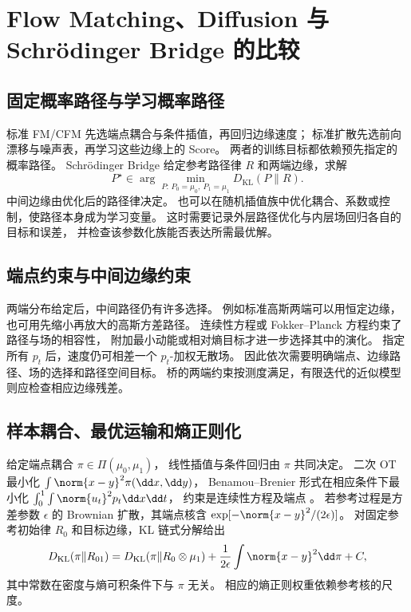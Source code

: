 \section{Flow Matching、Diffusion 与 Schrödinger Bridge 的比较}
\label{sec:unified-comparison}

\subsection{固定概率路径与学习概率路径}

标准 FM/CFM 先选端点耦合与条件插值，再回归边缘速度；
标准扩散先选前向漂移与噪声表，再学习这些边缘上的 Score。
两者的训练目标都依赖预先指定的概率路径。
Schrödinger Bridge 给定参考路径律 \(R\) 和两端边缘，求解
\begin{equation}
 P^\star\in\arg\min_{P:\,P_0=\mu_0,\ P_1=\mu_1}
                                      D_{\mathrm{KL}}(P\|R).
 \label{eq:unified-sb-objective}
\end{equation}
中间边缘由优化后的路径律决定。
也可以在随机插值族中优化耦合、系数或控制，使路径本身成为学习变量。
这时需要记录外层路径优化与内层场回归各自的目标和误差，
并检查该参数化族能否表达所需最优解。

\subsection{端点约束与中间边缘约束}

两端分布给定后，中间路径仍有许多选择。
例如标准高斯两端可以用恒定边缘，也可用先缩小再放大的高斯方差路径。
连续性方程或 Fokker--Planck 方程约束了路径与场的相容性，
附加最小动能或相对熵目标才进一步选择其中的演化。
指定所有 \(p_t\) 后，速度仍可相差一个 \(p_t\)-加权无散场。
因此依次需要明确端点、边缘路径、场的选择和路径空间目标。
桥的两端约束按测度满足，有限迭代的近似模型则应检查相应边缘残差。

\subsection{样本耦合、最优运输和熵正则化}

给定端点耦合 \(\pi\in\Pi(\mu_0,\mu_1)\)，
线性插值与条件回归由 \(\pi\) 共同决定。
二次 OT 最小化 \(\int\norm{x-y}^2\pi(\dd x,\dd y)\)，
Benamou--Brenier 形式在相应条件下最小化
\(\int_0^1\int\norm{u_t}^2p_t\dd x\dd t\)，
约束是连续性方程及端点 \cite{benamou2000ot}。
若参考过程是方差参数 \(\epsilon\) 的 Brownian 扩散，其端点核含
\(\exp[-\norm{x-y}^2/(2\epsilon)]\)。
对固定参考初始律 \(R_0\) 和目标边缘，KL 链式分解给出
\[
 D_{\mathrm{KL}}(\pi\|R_{01})
 =D_{\mathrm{KL}}(\pi\|R_0\otimes\mu_1)
       +\frac1{2\epsilon}\int\norm{x-y}^2\dd\pi+C,
\]
其中常数在密度与熵可积条件下与 \(\pi\) 无关。
相应的熵正则权重依赖参考核的尺度。

